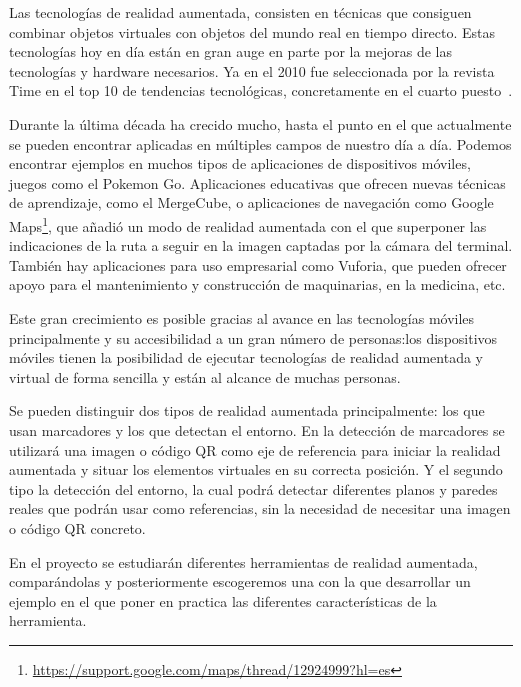 
Las tecnologías de realidad aumentada, consisten en técnicas que consiguen combinar objetos virtuales con objetos del mundo real en tiempo directo. 
Estas tecnologías hoy en día están en gran auge en parte por la mejoras de las tecnologías y hardware necesarios. Ya en el 2010 fue seleccionada por la revista Time en el top 10 de tendencias tecnológicas, concretamente en el cuarto puesto~\cite{fletcher_2010}. 

Durante la última década ha crecido mucho, hasta el punto en el que actualmente se pueden encontrar aplicadas en múltiples campos de nuestro día a día. Podemos encontrar ejemplos en muchos tipos de aplicaciones de dispositivos móviles, juegos como el Pokemon Go. Aplicaciones educativas que ofrecen nuevas técnicas de aprendizaje, como el MergeCube, o aplicaciones de navegación como Google Maps\footnote{\url{https://support.google.com/maps/thread/12924999?hl=es}}, que añadió un modo de realidad aumentada con el que superponer las indicaciones de la ruta a seguir en la imagen captadas por la cámara del terminal. También hay aplicaciones para uso empresarial como Vuforia, que pueden ofrecer apoyo para el mantenimiento y construcción de maquinarias, en la medicina, etc.

Este gran crecimiento es posible gracias al avance en las tecnologías móviles principalmente y su accesibilidad a un gran número de personas:los dispositivos móviles tienen la posibilidad de ejecutar tecnologías de realidad aumentada y virtual de forma sencilla y están al alcance de muchas personas.




Se pueden distinguir dos tipos de realidad aumentada principalmente: los que usan marcadores y los que detectan el entorno. En la detección de marcadores se utilizará una imagen o código QR como eje de referencia para iniciar la realidad aumentada y situar los elementos virtuales en su correcta posición. 
Y el segundo tipo la detección del entorno, la cual podrá detectar diferentes planos y paredes reales que podrán usar como referencias, sin la necesidad de necesitar una imagen o código QR concreto.


En el proyecto se estudiarán diferentes herramientas de realidad aumentada, comparándolas y posteriormente escogeremos una con la que desarrollar un ejemplo en el que poner en practica las diferentes características de la herramienta.


